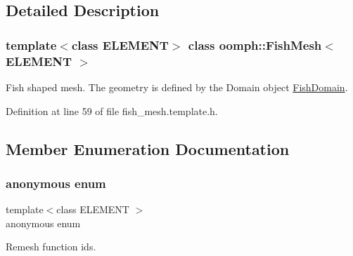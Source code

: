 \subsection{Detailed Description}
\subsubsection*{template$<$class E\+L\+E\+M\+E\+NT$>$\newline
class oomph\+::\+Fish\+Mesh$<$ E\+L\+E\+M\+E\+N\+T $>$}

Fish shaped mesh. The geometry is defined by the Domain object \hyperlink{classoomph_1_1FishDomain}{Fish\+Domain}. 

Definition at line 59 of file fish\+\_\+mesh.\+template.\+h.



\subsection{Member Enumeration Documentation}
\mbox{\label{classoomph_1_1FishMesh_a4a4137c4add890a283e51651c5c47f62}} 
\subsubsection{\texorpdfstring{anonymous enum}{anonymous enum}}
{\footnotesize\ttfamily template$<$class E\+L\+E\+M\+E\+NT $>$ \\
anonymous enum\hspace{0.3cm}{\ttfamily [protected]}}



Remesh function ids. 

